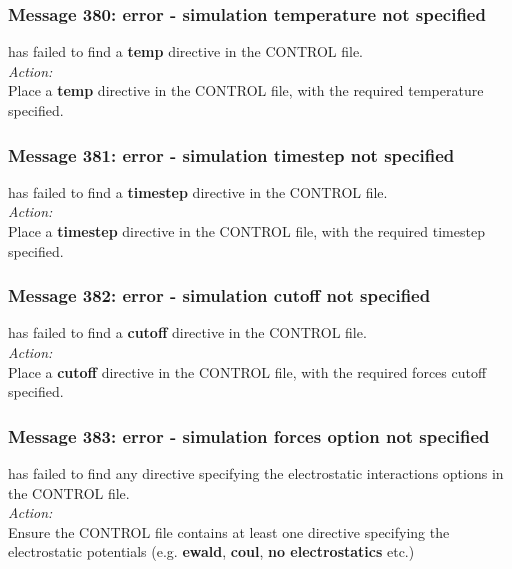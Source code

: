 \subsubsection*{Message 380: error - simulation temperature not specified}

\D{} has failed to find a {\bf temp} directive in the CONTROL file.\\

\noindent
{\em Action:} \\ 
Place a {\bf temp} directive in the CONTROL file, with the required
temperature specified.

\subsubsection*{Message 381: error - simulation timestep not specified}

\D{} has failed to find a {\bf timestep} directive in the CONTROL file.\\

\noindent
{\em Action:} \\ 
Place a {\bf timestep} directive in the CONTROL file, with the required
timestep specified.

\subsubsection*{Message 382: error - simulation cutoff not specified}

\D{} has failed to find a {\bf cutoff} directive in the CONTROL file.\\

\noindent
{\em Action:} \\ 
Place a {\bf cutoff} directive in the CONTROL file, with the required
forces cutoff specified.

\subsubsection*{Message 383: error - simulation forces option not specified}

\D{} has failed to find any directive specifying the electrostatic interactions
options in the CONTROL file.\\

\noindent
{\em Action:} \\ 
Ensure the CONTROL file contains at least one directive specifying the
electrostatic potentials  (e.g. {\bf ewald}, {\bf coul}, 
{\bf no electrostatics} etc.)

